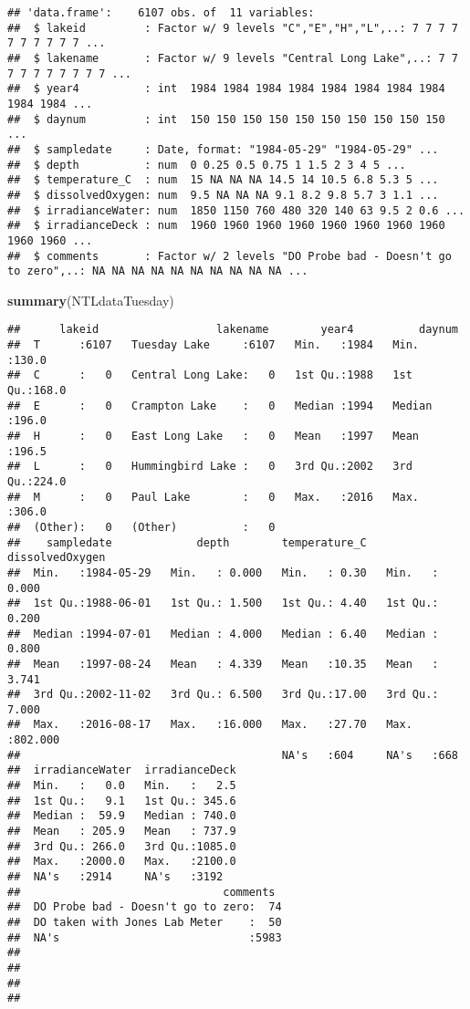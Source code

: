 \documentclass[]{article}
\newenvironment{Shaded}{\begin{snugshade}}{\end{snugshade}}
\newcommand{\KeywordTok}[1]{\textcolor[rgb]{0.13,0.29,0.53}{\textbf{#1}}}
\newcommand{\NormalTok}[1]{#1}
\begin{document}
\begin{verbatim}
## 'data.frame':    6107 obs. of  11 variables:
##  $ lakeid         : Factor w/ 9 levels "C","E","H","L",..: 7 7 7 7 7 7 7 7 7 7 ...
##  $ lakename       : Factor w/ 9 levels "Central Long Lake",..: 7 7 7 7 7 7 7 7 7 7 ...
##  $ year4          : int  1984 1984 1984 1984 1984 1984 1984 1984 1984 1984 ...
##  $ daynum         : int  150 150 150 150 150 150 150 150 150 150 ...
##  $ sampledate     : Date, format: "1984-05-29" "1984-05-29" ...
##  $ depth          : num  0 0.25 0.5 0.75 1 1.5 2 3 4 5 ...
##  $ temperature_C  : num  15 NA NA NA 14.5 14 10.5 6.8 5.3 5 ...
##  $ dissolvedOxygen: num  9.5 NA NA NA 9.1 8.2 9.8 5.7 3 1.1 ...
##  $ irradianceWater: num  1850 1150 760 480 320 140 63 9.5 2 0.6 ...
##  $ irradianceDeck : num  1960 1960 1960 1960 1960 1960 1960 1960 1960 1960 ...
##  $ comments       : Factor w/ 2 levels "DO Probe bad - Doesn't go to zero",..: NA NA NA NA NA NA NA NA NA NA ...
\end{verbatim}

\begin{Shaded}
\begin{Highlighting}[]
\KeywordTok{summary}\NormalTok{(NTLdataTuesday)}
\end{Highlighting}
\end{Shaded}

\begin{verbatim}
##      lakeid                  lakename        year4          daynum     
##  T      :6107   Tuesday Lake     :6107   Min.   :1984   Min.   :130.0  
##  C      :   0   Central Long Lake:   0   1st Qu.:1988   1st Qu.:168.0  
##  E      :   0   Crampton Lake    :   0   Median :1994   Median :196.0  
##  H      :   0   East Long Lake   :   0   Mean   :1997   Mean   :196.5  
##  L      :   0   Hummingbird Lake :   0   3rd Qu.:2002   3rd Qu.:224.0  
##  M      :   0   Paul Lake        :   0   Max.   :2016   Max.   :306.0  
##  (Other):   0   (Other)          :   0                                 
##    sampledate             depth        temperature_C   dissolvedOxygen  
##  Min.   :1984-05-29   Min.   : 0.000   Min.   : 0.30   Min.   :  0.000  
##  1st Qu.:1988-06-01   1st Qu.: 1.500   1st Qu.: 4.40   1st Qu.:  0.200  
##  Median :1994-07-01   Median : 4.000   Median : 6.40   Median :  0.800  
##  Mean   :1997-08-24   Mean   : 4.339   Mean   :10.35   Mean   :  3.741  
##  3rd Qu.:2002-11-02   3rd Qu.: 6.500   3rd Qu.:17.00   3rd Qu.:  7.000  
##  Max.   :2016-08-17   Max.   :16.000   Max.   :27.70   Max.   :802.000  
##                                        NA's   :604     NA's   :668      
##  irradianceWater  irradianceDeck  
##  Min.   :   0.0   Min.   :   2.5  
##  1st Qu.:   9.1   1st Qu.: 345.6  
##  Median :  59.9   Median : 740.0  
##  Mean   : 205.9   Mean   : 737.9  
##  3rd Qu.: 266.0   3rd Qu.:1085.0  
##  Max.   :2000.0   Max.   :2100.0  
##  NA's   :2914     NA's   :3192    
##                               comments   
##  DO Probe bad - Doesn't go to zero:  74  
##  DO taken with Jones Lab Meter    :  50  
##  NA's                             :5983  
##                                          
##                                          
##                                          
## 
\end{verbatim}
\end{document}
